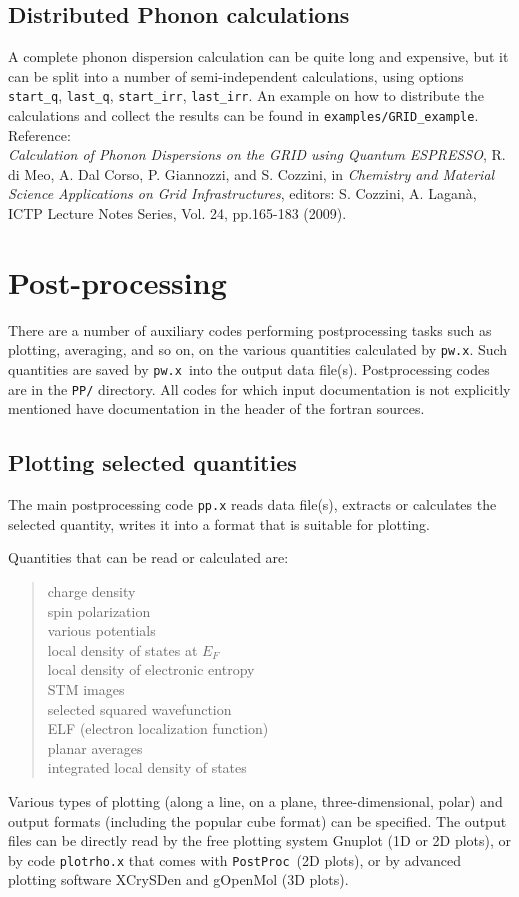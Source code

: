 \documentclass[12pt,a4paper]{article}
\def\pwx{\texttt{pw.x}}
\def\PostProc{\texttt{PostProc}}
\begin{document}
\subsection{Distributed Phonon calculations}
A complete phonon dispersion calculation can be quite long and
expensive, but it can be split into a number of semi-independent 
calculations, using options \texttt{start\_q}, \texttt{last\_q},
\texttt{start\_irr}, \texttt{last\_irr}. An example on how to 
distribute the calculations and collect the results can be found
in \texttt{examples/GRID\_example}. Reference:\\
{\it Calculation of Phonon Dispersions on the GRID using Quantum
     ESPRESSO},
     R. di Meo, A. Dal Corso, P. Giannozzi, and S. Cozzini, in 
     {\it Chemistry and Material Science Applications on Grid Infrastructures},
     editors: S. Cozzini, A. Lagan\`a, ICTP Lecture Notes Series, 
     Vol. 24, pp.165-183 (2009). 

\section{Post-processing}

There are a number of auxiliary codes performing postprocessing tasks such
as plotting, averaging, and so on, on the various quantities calculated by
\pwx. Such quantities are saved by \pwx\ into the output data file(s). 
Postprocessing codes are in the \texttt{PP/} directory. All codes for 
which input documentation is not explicitly mentioned have documentation
in the header of the fortran sources.

\subsection{Plotting selected quantities}
  
The main postprocessing code \texttt{pp.x} reads data file(s), extracts or calculates 
the selected quantity, writes it into a format that is suitable for plotting.

Quantities that can be read or calculated are:
\begin{quote}
      charge density\\
      spin polarization\\
      various potentials\\
      local density of states at $E_F$\\
      local density of electronic entropy\\
      STM images\\
      selected squared wavefunction\\
      ELF (electron localization function)\\
      planar averages\\
      integrated local density of states
\end{quote}
Various types of plotting (along a line, on a plane, three-dimensional, polar)
and output formats (including the popular cube format) can be specified.
The output files can be directly read by the free plotting system Gnuplot
(1D or 2D plots), or by code \texttt{plotrho.x} that comes with \PostProc\ (2D plots),
or by advanced plotting software XCrySDen and gOpenMol (3D plots).
\end{document}
